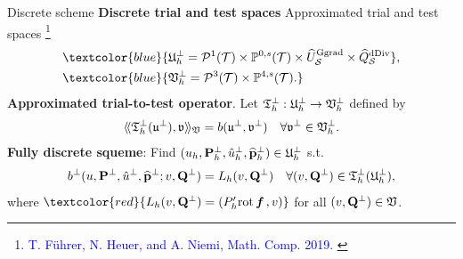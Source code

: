 \documentclass[10pt, compress]{beamer}
\begin{document}
\begin{frame}{Discrete scheme}
     \textbf{Discrete trial and test spaces} Approximated trial and test spaces \footnote[1]{\textcolor{blue}{T. F\"uhrer, N. Heuer, and A. Niemi, Math. Comp. 2019. } }
     \begin{align*}
         &\textcolor{blue}{\UU^\perp_h =\cP^1(\cT) \times \mathbb{P}^{0,s}(\cT)\times \tU^{\tGGrad}_{\cS} \times \tQ^{\tdDiv}_\cS},   \\
         &\textcolor{blue}{\VV^\perp_h = \cP^3(\cT) \times \mathbb{P}^{4,s}(\cT).}
     \end{align*}
     \textbf{ Approximated trial-to-test operator}. Let ${\mathfrak{T}}_h^\perp:\mathfrak{U}_h^\perp \to \mathfrak{V}_h^\perp $ defined by
    \begin{align*}
        \langle\!\langle {\mathfrak{T}}^\perp_h(\mathfrak{u}^\perp),\mathfrak{v}\rangle\!\rangle_{\mathfrak{V}}=b(\mathfrak{u}^\perp,\mathfrak{v}^\perp) \quad \forall \mathfrak{v}^\perp \in \mathfrak{V}_h^\perp.
    \end{align*}
     \textbf{ Fully discrete squeme}: Find $(u_h,\mathbf{P}^\perp_h,{\hat u}^\perp_h,\widehat{\mathbf{p}}^\perp_h) \in \mathfrak{U}^\perp_h$ s.t.
     \begin{align*}
     b^\perp(u,\mathbf{P}^\perp,{\hat u}^\perp,\widehat{\mathbf{p}}^\perp;v,\mathbf{Q}^\perp)=L_h(v,\mathbf{Q}^\perp) \quad \forall (v,\mathbf{Q}^\perp) \in{\mathfrak{T}}_h^\perp(\mathfrak{U}_h^\perp),
     \end{align*}
     where $\textcolor{red}{L_h(v,\QQ^\perp)=\vdual{P_h'\rot \ff}{v}}$ for all $(v,\mathbf{Q}^\perp) \in \mathfrak{V}$. 
\end{frame}
\end{document}
